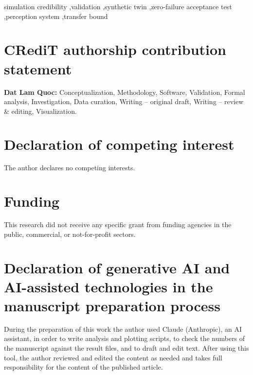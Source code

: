 \documentclass[preprint,12pt]{elsarticle}
\theoremstyle{definition}
\theoremstyle{remark}
\begin{document}
\begin{frontmatter}
\title{\PaperTitle}
\author{Dat Lam Quoc}

\begin{abstract}

\end{abstract}

\begin{keyword}
simulation credibility \sep validation \sep synthetic twin \sep zero-failure acceptance test \sep perception system
\sep transfer bound
\end{keyword}
\end{frontmatter}

\linenumbers





\section*{CRediT authorship contribution statement}
\textbf{Dat Lam Quoc:} Conceptualization, Methodology, Software, Validation, Formal analysis, Investigation, Data
curation, Writing -- original draft, Writing -- review \& editing, Visualization.

\section*{Declaration of competing interest}
The author declares no competing interests.

\section*{Funding}
This research did not receive any specific grant from funding agencies in the public, commercial, or not-for-profit
sectors.

\section*{Declaration of generative AI and AI-assisted technologies in the manuscript preparation process}
During the preparation of this work the author used Claude (Anthropic), an AI assistant, in order to write analysis and
plotting scripts, to check the numbers of the manuscript against the result files, and to draft and edit text. After
using this tool, the author reviewed and edited the content as needed and takes full responsibility for the content of
the published article.
\end{document}

